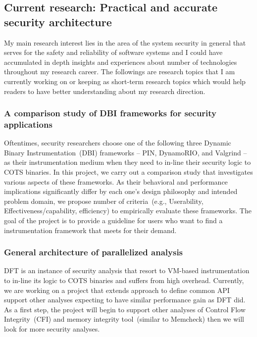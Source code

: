 \documentclass[letterpaper, 10pt]{article}
\begin{document}
\begin{small}
\subsection*{Current research: Practical and accurate security architecture}
%
My main research interest lies in the area of the system security in general
that serves for the safety and reliability of software systems and I could have
accumulated in depth insights and experiences about number of technologies
throughout my research career.
%
The followings are research topics that I am currently working on or keeping as
short-term research topics which would help readers to have better
understanding about my research direction.

\subsubsection*{A comparison study of DBI frameworks for security applications}
%
Oftentimes, security researchers choose one of the following three Dynamic
Binary Instrumentation~(DBI) frameworks -- PIN, DynamoRIO, and Valgrind -- as
their instrumentation medium when they need to in-line their security logic to
COTS binaries.
%
In this project, we carry out a comparison study that investigates various
aspects of these frameworks. As their behavioral and performance implications
significantly differ by each one's design philosophy and intended problem
domain, we propose number of criteria~(e.g., Userability,
Effectiveness/capability, efficiency) to empirically evaluate these frameworks.
%
The goal of the project is to provide a guideline for users who want to find a
instrumentation framework that meets for their demand.

\subsubsection*{General architecture of parallelized analysis} 
%
DFT is an instance of security analysis that resort to VM-based instrumentation
to in-line its logic to COTS binaries and suffers from high overhead.
%
Currently, we are working on a project that extends \SR approach to define
common API support other analyses expecting to have similar performance gain as
DFT did. 
%
As a first step, the project will begin to support other analyses of Control
Flow Integrity~(CFI) and memory integrity tool~(similar to Memcheck) then we
will look for more security analyses.


\end{small}
\end{document}
